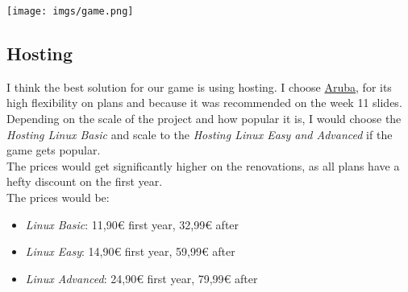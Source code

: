 \documentclass[12pt]{article}
\begin{document}
    \texttt{[image: imgs/game.png]}
\subsection{Hosting}
    I think the best solution for our game is using hosting. I choose \href{https://hosting.aruba.it/}{Aruba}, for its high flexibility on plans and because it was recommended on the week 11 slides.\\

    Depending on the scale of the project and how popular it is, I would choose the \textit{Hosting Linux Basic} and scale to the \textit{Hosting Linux Easy and Advanced} if the game gets popular.\\

    The prices would get significantly higher on the renovations, as all plans have a hefty discount on the first year.\\

    The prices would be: 
    \begin{itemize}
        \item \textit{Linux Basic}: 11,90€ first year, 32,99€ after
        \item \textit{Linux Easy}: 14,90€ first year, 59,99€ after
        \item \textit{Linux Advanced}: 24,90€ first year, 79,99€ after
    \end{itemize}
\end{document}
